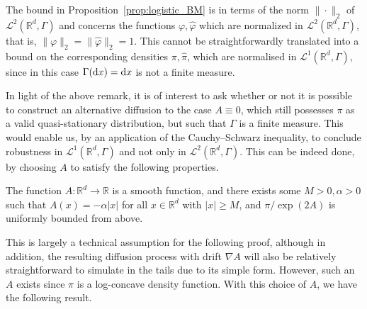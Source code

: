 \documentclass{aptpub}
\newcommand{\R}{\mathbb R}
\newcommand{\Rd}{\mathbb R^d}
\begin{document}
\begin{remark}
    The bound in Proposition~\ref{prop:logistic_BM} is in terms of the norm $\|\cdot \|_2$ of $\mathcal L^2(\Rd,\Gamma)$ and concerns the functions $\varphi, \widehat{\varphi}$ which are normalized in $\mathcal L^2(\Rd,\Gamma)$, that is, $\|{\varphi}\|_2=\|\widehat{\varphi}\|_2 =1$. This cannot be straightforwardly translated into a bound on the corresponding densities $\pi, \widehat\pi$, which are normalised in $\mathcal L^1(\Rd,\Gamma)$, since in this case $\Gamma(\dif x)=\dif x$ is not a finite measure.
\end{remark}
In light of the above remark, it is of interest to ask whether or not it is possible to construct an alternative diffusion to the case $A\equiv 0$, which still possesses $\pi$ as a valid quasi-stationary distribution, but such that $\Gamma$ is a finite measure. This would enable us, by an application of the Cauchy--Schwarz inequality, to conclude robustness in $\mathcal L^1(\Rd,\Gamma)$ and not only in $\mathcal L^2(\Rd,\Gamma)$. This can be indeed done, by choosing $A$ to satisfy the following properties.
\begin{assumption}
    The function $A:\Rd\to \R$ is a smooth function, and there exists some $M>0, \alpha >0$ such that $A(x)=-\alpha \vert x\vert$ for all $x\in \Rd$ with $\vert x\vert \ge M$, and $\pi/\exp(2A)$ is uniformly bounded from above.
    \label{assm:logistic_A}
\end{assumption}
 
 This is largely a technical assumption for the following proof, although in addition, the resulting diffusion process with drift $\nabla A$ will also be relatively straightforward to simulate in the tails due to its simple form. 
 However, such an $A$ exists since $\pi$ is a log-concave density function.
  With this choice of $A$, we have the following result.
 
\end{document}
